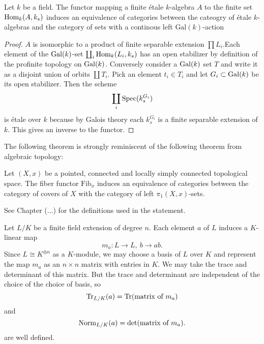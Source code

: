 \begin{definition}

\end{definition}

\begin{theorem}\label{theorem:galois}
	Let $k$ be a field. The functor mapping a finite \'etale $k$-algebra $A$ to the finite set $\operatorname{Hom}_k(A, k_s)$ induces an equivalence of categories between the cateogry of \'etale $k$-algebras and the category of sets with a continous left $\text{Gal}(k)$-action
\end{theorem}

\begin{proof}
	$A$ is isomorphic to a product of finite separable extension $\prod L_i$.Each element of the $\operatorname{Gal}(k)$-set $\coprod_i \operatorname{Hom}_k(L_i, k_s)$ has an open stabilizer by definition of the profinite topology on $\operatorname{Gal}(k)$. Conversely consider a $\operatorname{Gal}(k)$ set $T$ and write it as a disjoint union of orbits $\coprod T_i$. Pick an element $t_i \in T_i$ and let $G_i \subset \operatorname{Gal}(k)$ be its open stabilizer. Then the scheme
	\[
		\coprod_i \operatorname{Spec}(k_s^{G_i})
	\]
	is \'etale over $k$ because by Galois theory each $k_s^{G_i}$ is a finite separable extension of $k$. This gives an inverse to the functor.
\end{proof}

The following theorem is strongly reminiscent of the following theorem from algebraic topology:

\begin{theorem}
	Let $(X,x)$ be a pointed, connected and locally simply connected topological space. The fiber functor $\text{Fib}_x$ induces an equivalence of categories between the category of covers of $X$ with the category of left $\pi_1(X,x)$-sets.
\end{theorem}

See Chapter (...) for the definitions used in the statement.

Let $L/K$ be a finite field extension of degree $n$. Each element $a$ of $L$ induces a $K$-linear map
\[
	m_a: L \to L,\ b \to ab.
\]
Since $L \cong K^{\oplus n}$ as a $K$-module, we may choose a basis of $L$ over $K$ and represent the map $m_a$ as an $n \times n$ matrix with entries in $K$. We may take the trace and determinant of this matrix. But the trace and determinant are independent of the choice of the choice of basis, so
\[
	\operatorname{Tr}_{L/K}(a) = \operatorname{Tr}(\text{matrix of }m_a)
\]
and
\[
	\operatorname{Norm}_{L/K}(a) = \text{det}(\text{matrix of }m_a).
\]
are well defined.

